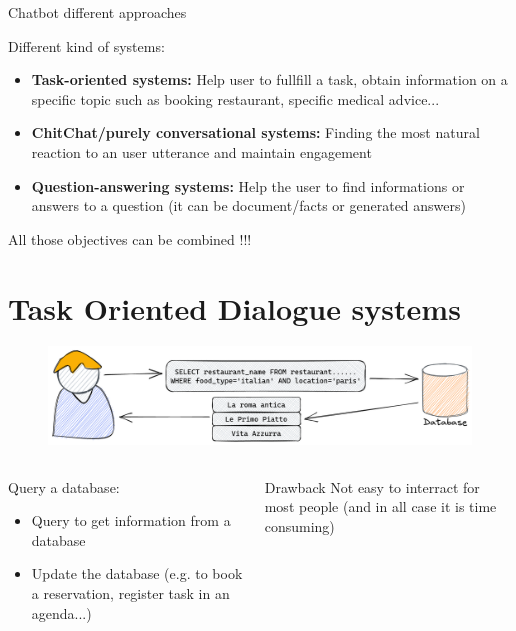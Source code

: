 \documentclass[10pt,aspectratio=169]{beamer}
\begin{document}
\begin{frame}{Chatbot different approaches}

            \begin{block}{Different  kind of systems: }
                \begin{itemize}
                    \item \textbf{Task-oriented systems:} Help user to fullfill a task, obtain information on a specific topic such as booking restaurant, specific medical advice...
                    \item \textbf{ChitChat/purely conversational systems:} Finding the most natural reaction to an user utterance and maintain engagement
                    \item \textbf{Question-answering systems:} Help the user to find informations or answers to a question (it can be document/facts or generated answers)
                \end{itemize}
            \end{block}
            All those objectives can be combined !!!

\end{frame}

\section{Task Oriented Dialogue systems}
\begin{frame}
    \begin{figure}[t]
        \centering
        \includegraphics[width=.9\textwidth]{media/task-dial-2.png}
    \end{figure}
    \begin{columns}
        \begin{column}{0.5\textwidth}
            \begin{block}{Query a database:}
                \begin{itemize}
                    \item Query to get information from a database
                    \item Update the database (e.g. to book a reservation, register task in an agenda...)
                \end{itemize}
            \end{block}
        \end{column}
        \begin{column}{0.5\textwidth}
            \begin{alertblock}{Drawback}
                Not easy to interract  for most people (and in all case it is time consuming)
            \end{alertblock}
        \end{column}
    \end{columns}
\end{frame}
\end{document}
